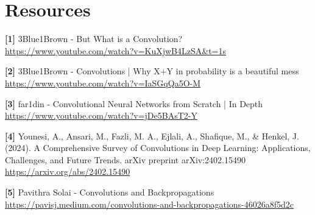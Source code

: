 \documentclass{article}
\begin{document}
\section{Resources}
    \textbf{[1]} 3Blue1Brown - But What is a Convolution? \\
    \url{https://www.youtube.com/watch?v=KuXjwB4LzSA&t=1s}
    
    \textbf{[2]} 3Blue1Brown - Convolutions | Why X+Y in probability is a beautiful mess \\
    \url{https://www.youtube.com/watch?v=IaSGqQa5O-M}
    
    \textbf{[3]} far1din - Convolutional Neural Networks from Scratch | In Depth \\
    \url{https://www.youtube.com/watch?v=jDe5BAsT2-Y}
    
    \textbf{[4]} Younesi, A., Ansari, M., Fazli, M. A., Ejlali, A., Shafique, M., \& Henkel, J. (2024). A Comprehensive Survey of Convolutions in Deep Learning: Applications, Challenges, and Future Trends. arXiv preprint arXiv:2402.15490 \\
    \url{https://arxiv.org/abs/2402.15490}

    \textbf{[5]} Pavithra Solai - Convolutions and Backpropagations \\
    \url{https://pavisj.medium.com/convolutions-and-backpropagations-46026a8f5d2c}
\end{document}
